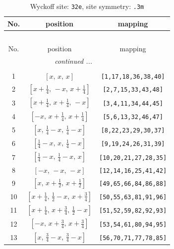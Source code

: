 \documentclass[fleqn,8pt]{jsarticle}
\begin{document}
\begin{longtable}{ccc}
\caption{Wyckoff site: {\tt 32e}, site symmetry: {\tt .3m}}
 \\
 \hline \hline
No. & position & mapping \\ \hline \endfirsthead

\multicolumn{2}{l}{\tablename\ \thetable{}} \\
 \hline \hline
No. & position & mapping \\ \hline \endhead

 \hline \hline
\multicolumn{2}{r}{\footnotesize\it continued ...} \\ \endfoot

 \hline \hline
\multicolumn{2}{r}{} \\ \endlastfoot

1 & $\left[ x,\, x,\, x \right]$ & {\tt [1,17,18,36,38,40]} \\ \hline
2 & $\left[ x + \frac{1}{4},\, - x,\, x + \frac{1}{4} \right]$ & {\tt [2,7,15,33,43,48]} \\ \hline
3 & $\left[ x + \frac{1}{4},\, x + \frac{1}{4},\, - x \right]$ & {\tt [3,4,11,34,44,45]} \\ \hline
4 & $\left[ - x,\, x + \frac{1}{4},\, x + \frac{1}{4} \right]$ & {\tt [5,6,13,32,46,47]} \\ \hline
5 & $\left[ x,\, \frac{1}{4} - x,\, \frac{1}{4} - x \right]$ & {\tt [8,22,23,29,30,37]} \\ \hline
6 & $\left[ \frac{1}{4} - x,\, x,\, \frac{1}{4} - x \right]$ & {\tt [9,19,24,26,31,39]} \\ \hline
7 & $\left[ \frac{1}{4} - x,\, \frac{1}{4} - x,\, x \right]$ & {\tt [10,20,21,27,28,35]} \\ \hline
8 & $\left[ - x,\, - x,\, - x \right]$ & {\tt [12,14,16,25,41,42]} \\ \hline
9 & $\left[ x,\, x + \frac{1}{2},\, x + \frac{1}{2} \right]$ & {\tt [49,65,66,84,86,88]} \\ \hline
10 & $\left[ x + \frac{1}{4},\, \frac{1}{2} - x,\, x + \frac{3}{4} \right]$ & {\tt [50,55,63,81,91,96]} \\ \hline
11 & $\left[ x + \frac{1}{4},\, x + \frac{3}{4},\, \frac{1}{2} - x \right]$ & {\tt [51,52,59,82,92,93]} \\ \hline
12 & $\left[ - x,\, x + \frac{3}{4},\, x + \frac{3}{4} \right]$ & {\tt [53,54,61,80,94,95]} \\ \hline
13 & $\left[ x,\, \frac{3}{4} - x,\, \frac{3}{4} - x \right]$ & {\tt [56,70,71,77,78,85]} \\ \hline

\end{longtable}
\end{document}
